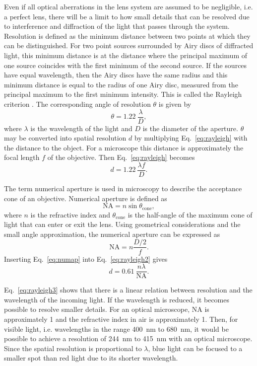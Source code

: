 Even if all optical aberrations in the lens system are assumed to be negligible, i.e. a perfect lens, there will be a limit to how small details that can be resolved due to interference and diffraction of the light that passes through the system. Resolution is defined as the minimum distance between two points at which they can be distinguished. For two point sources surrounded by Airy discs of diffracted light, this minimum distance is at the distance where the principal maximum of one source coincides with the first minimum of the second source. If the sources have equal wavelength, then the Airy discs have the same radius and this minimum distance is equal to the radius of one Airy disc, measured from the principal maximum to the first minimum intensity. This is called the Rayleigh criterion \citep{rayleigh1879investigations, rayleigh1880investigations}. The corresponding angle of resolution $\theta$ is given by
\begin{equation}\label{eq:rayleigh}
\theta = \SI{1.22}{}\frac{\lambda}{D},
\end{equation}
where $\lambda$ is the wavelength of the light and $D$ is the diameter of the aperture. $\theta$ may be converted into spatial resolution $d$ by multiplying Eq.~\eqref{eq:rayleigh} with the distance to the object. For a microscope this distance is approximately the focal length $f$ of the objective. Then Eq.~\eqref{eq:rayleigh} becomes
\begin{equation}\label{eq:rayleigh2}
d = \SI{1.22}{}\frac{\lambda f}{D}.
\end{equation}

The term numerical aperture is used in microscopy to describe the acceptance cone of an objective. Numerical aperture is defined as
\[\text{NA}=n\sin\theta_\text{cone},\]
where $n$ is the refractive index and $\theta_\text{cone}$ is the half-angle of the maximum cone of light that can enter or exit the lens. Using geometrical considerations and the small angle approximation, the numerical aperture can be expressed as
\begin{equation}\label{eq:numap}
\text{NA} = n\frac{D/2}{f}.
\end{equation}
Inserting Eq.~\eqref{eq:numap} into Eq.~\eqref{eq:rayleigh2} gives
\begin{equation}\label{eq:rayleigh3}
d = \SI{0.61}{}\frac{n\lambda}{\text{NA}}.
\end{equation}

Eq.~\eqref{eq:rayleigh3} shows that there is a linear relation between resolution and the wavelength of the incoming light. If the wavelength is reduced, it becomes possible to resolve smaller details. For an optical microscope, $\text{NA}$ is approximately 1 and the refractive index in air is approximately 1. Then, for visible light, i.e. wavelengths in the range \SI{400}{\nano\metre} to \SI{680}{\nano\metre}, it would be possible to achieve a resolution of \SI{244}{\nano\metre} to \SI{415}{\nano\metre} with an optical microscope. Since the spatial resolution is proportional to $\lambda$, blue light can be focused to a smaller spot than red light due to its shorter wavelength.
